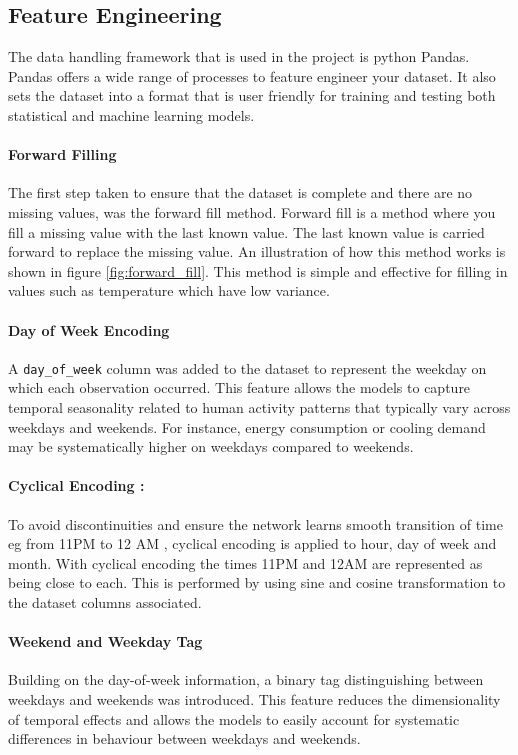 \subsection{Feature Engineering}
The data handling framework that is used in the project is python Pandas. Pandas offers a wide range of processes to feature engineer your dataset. It also sets the dataset into a format that is user friendly for training and testing both statistical and machine learning models. 

\paragraph{Forward Filling}
The first step taken to ensure that the dataset is complete and there are no missing values, was the forward fill method. Forward fill is a method where you fill a missing value with the last known value. The last known value is carried forward to replace the missing value. An illustration of how this method works is shown in figure \ref{fig:forward_fill}. This method is simple and effective for filling in values such as temperature which have low variance. 

\paragraph{Day of Week Encoding}
A \texttt{day\_of\_week} column was added to the dataset to represent the weekday on which each observation occurred. This feature allows the models to capture temporal seasonality related to human activity patterns that typically vary across weekdays and weekends. For instance, energy consumption or cooling demand may be systematically higher on weekdays compared to weekends.
\paragraph{Cyclical Encoding : } To avoid discontinuities and ensure the network learns smooth transition of time eg from 11PM to 12 AM , cyclical encoding is applied to hour, day of week and month. With cyclical encoding the times 11PM and 12AM are represented as being close to each. This is performed by using sine and cosine transformation to the dataset columns associated.

\paragraph{Weekend and Weekday Tag}
Building on the day-of-week information, a binary tag distinguishing between weekdays and weekends was introduced. This feature reduces the dimensionality of temporal effects and allows the models to easily account for systematic differences in behaviour between weekdays and weekends.

